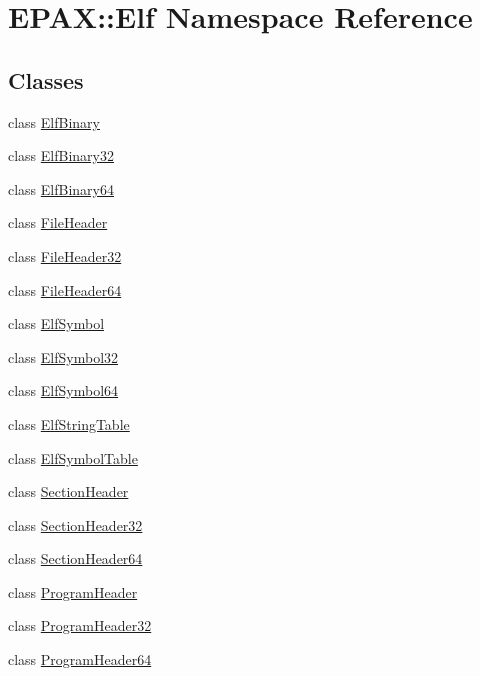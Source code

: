 \hypertarget{namespace_e_p_a_x_1_1_elf}{\section{\-E\-P\-A\-X\-:\-:\-Elf \-Namespace \-Reference}
\label{namespace_e_p_a_x_1_1_elf}
}
\subsection*{\-Classes}
\begin{DoxyCompactItemize}
\item 
class \hyperlink{class_e_p_a_x_1_1_elf_1_1_elf_binary}{\-Elf\-Binary}
\item 
class \hyperlink{class_e_p_a_x_1_1_elf_1_1_elf_binary32}{\-Elf\-Binary32}
\item 
class \hyperlink{class_e_p_a_x_1_1_elf_1_1_elf_binary64}{\-Elf\-Binary64}
\item 
class \hyperlink{class_e_p_a_x_1_1_elf_1_1_file_header}{\-File\-Header}
\item 
class \hyperlink{class_e_p_a_x_1_1_elf_1_1_file_header32}{\-File\-Header32}
\item 
class \hyperlink{class_e_p_a_x_1_1_elf_1_1_file_header64}{\-File\-Header64}
\item 
class \hyperlink{class_e_p_a_x_1_1_elf_1_1_elf_symbol}{\-Elf\-Symbol}
\item 
class \hyperlink{class_e_p_a_x_1_1_elf_1_1_elf_symbol32}{\-Elf\-Symbol32}
\item 
class \hyperlink{class_e_p_a_x_1_1_elf_1_1_elf_symbol64}{\-Elf\-Symbol64}
\item 
class \hyperlink{class_e_p_a_x_1_1_elf_1_1_elf_string_table}{\-Elf\-String\-Table}
\item 
class \hyperlink{class_e_p_a_x_1_1_elf_1_1_elf_symbol_table}{\-Elf\-Symbol\-Table}
\item 
class \hyperlink{class_e_p_a_x_1_1_elf_1_1_section_header}{\-Section\-Header}
\item 
class \hyperlink{class_e_p_a_x_1_1_elf_1_1_section_header32}{\-Section\-Header32}
\item 
class \hyperlink{class_e_p_a_x_1_1_elf_1_1_section_header64}{\-Section\-Header64}
\item 
class \hyperlink{class_e_p_a_x_1_1_elf_1_1_program_header}{\-Program\-Header}
\item 
class \hyperlink{class_e_p_a_x_1_1_elf_1_1_program_header32}{\-Program\-Header32}
\item 
class \hyperlink{class_e_p_a_x_1_1_elf_1_1_program_header64}{\-Program\-Header64}
\end{DoxyCompactItemize}
